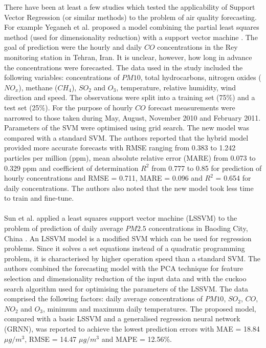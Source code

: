 There have been at least a few studies which tested the applicability of Support Vector Regression (or similar methods) to the problem of air quality forecasting. For example Yeganeh et al. proposed a model combining the partial least squares method (used for dimensionality reduction) with a support vector machine \cite{YEGANEH2012357}. The goal of prediction were the hourly and daily $CO$ concentrations in the Rey monitoring station in Tehran, Iran. It is unclear, however, how long in advance the concentrations were forecasted. The data used in the study included the following variables: concentrations of $PM10$, total hydrocarbons, nitrogen oxides ($NO_x$), methane ($CH_4$), $SO_2$ and $O_3$, temperature, relative humidity, wind direction and speed. The observations were split into a training set (75\%) and a test set (25\%). For the purpose of hourly $CO$ forecast measurements were narrowed to those taken during May, August, November 2010 and February 2011. Parameters of the SVM were optimised using grid search. The new model was compared with a standard SVM. The authors reported that the hybrid model provided more accurate forecasts with RMSE ranging from 0.383 to 1.242 particles per million (ppm), mean absolute relative error (MARE) from 0.073 to 0.329 ppm and coefficient of determination $R^2$ from 0.777 to 0.85 for prediction of hourly concentrations and RMSE = 0.711, MARE = 0.096 and $R^2$ = 0.654 for daily concentrations. The authors also noted that the new model took less time to train and fine-tune.
\\\\
Sun et al. applied a least squares support vector machine (LSSVM) to the problem of prediction of daily average $PM2.5$ concentrations in Baoding City, China \cite{SUN2017144}. An LSSVM model is a modified SVM which can be used for regression problems. Since it solves a set equations instead of a quadratic programming problem, it is characterised by higher operation speed than a standard SVM. The authors combined the forecasting model with the PCA technique for feature selection and dimensionality reduction of the input data and with the cuckoo search algorithm used for optimising the parameters of the LSSVM. The data comprised the following factors: daily average concentrations of $PM10$, $SO_2$, $CO$, $NO_2$ and $O_3$, minimum and maximum daily temperatures. The proposed model, compared with a basic LSSVM and a generalised regression neural network (GRNN), was reported to achieve the lowest prediction errors with MAE = 18.84 $\mu g / m^3$, RMSE = 14.47 $\mu g / m^3$ and MAPE = 12.56\%.
